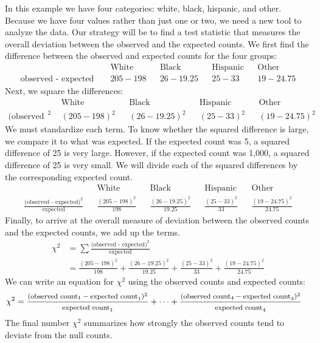 In this example we have four categories: white, black, hispanic, and other. Because we have four values rather than just one or two, we need a new tool to analyze the data. Our strategy will be to find a test statistic that measures the overall deviation between the observed and the expected counts. We first find the difference between the observed and expected counts for the four groups:
\begin{align*}
&&\text{White} && \text{Black} && \text{Hispanic} && \text{Other} \\
\text{observed - expected }&& 205-198 && 26-19.25
	&& 25-33
	&& 19-24.75
\end{align*}
Next, we square the differences:
\begin{align*}
&&\text{White} && \text{Black} && \text{Hispanic} && \text{Other} \\
\text{(observed - expected)}^2 && (205-198)^2 && (26-19.25)^2
	&& (25-33)^2
	&& (19-24.75)^2
\end{align*}
We must standardize each term. To know whether the squared difference is large, we compare it to what was expected. If the expected count was 5, a squared difference of 25 is very large. However, if the expected count was 1,000, a squared difference of 25 is very small. We will divide each of the squared differences by the corresponding expected count.
\begin{align*}
&&\text{White} && \text{Black} && \text{Hispanic} && \text{Other} \\
\frac{\text{(observed - expected)}^2}{\text{expected}} && \frac{(205-198)^2}{198} && \frac{(26-19.25)^2 }{19.25}
	&& \frac{(25-33)^2}{33}
	&& \frac{(19-24.75)^2}{24.75}
\end{align*}
Finally, to arrive at the overall measure of deviation between the observed counts and the expected counts, we add up the terms.
\begin{align*}
\chi^2 &= \sum{\frac{\text{(observed - expected)}^2}{\text{expected}}} \\
	&= \frac{(205-198)^2}{198}
		+ \frac{(26-19.25)^2 }{19.25}
		+ \frac{(25-33)^2}{33}
		+ \frac{(19-24.75)^2}{24.75}
\end{align*}
We can write an equation for $\chi^2$ using the observed counts and expected counts:
{\begin{align*}
\chi^2 &=
	\frac
	{\text{\footnotesize$(\text{observed count}_1 - \text{expected count}_1)^2$}}
	{\text{\footnotesize$\text{expected count}_1$}}
	+ \dots + \frac
	{\text{\footnotesize$(\text{observed count}_4 - \text{expected count}_4)^2$}}
	{\text{\footnotesize$\text{expected count}_4$}}
\end{align*}
}The final number $\chi^2$ summarizes how strongly the observed counts tend to deviate from the null counts.


